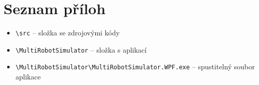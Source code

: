 \chapter*{Seznam příloh}
\begin{itemize}
	\item \verb|\src| -- složka se zdrojovými kódy
	\item \verb|\MultiRobotSimulator| -- složka s aplikací
	\item \verb|\MultiRobotSimulator\MultiRobotSimulator.WPF.exe| -- spustitelný soubor aplikace
	
\end{itemize}
